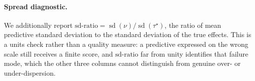\paragraph{Spread diagnostic.}
We additionally report
$\mathrm{sd\text{-}ratio} = \operatorname{sd}(\nu) / \operatorname{sd}(\tau^\star)$,
the ratio of mean predictive standard deviation to the standard deviation of
the true effects. This is a units check rather than a quality measure: a
predictive expressed on the wrong scale still receives a finite score, and
$\mathrm{sd\text{-}ratio}$ far from unity identifies that failure mode, which
the other three columns cannot distinguish from genuine over- or
under-dispersion.
